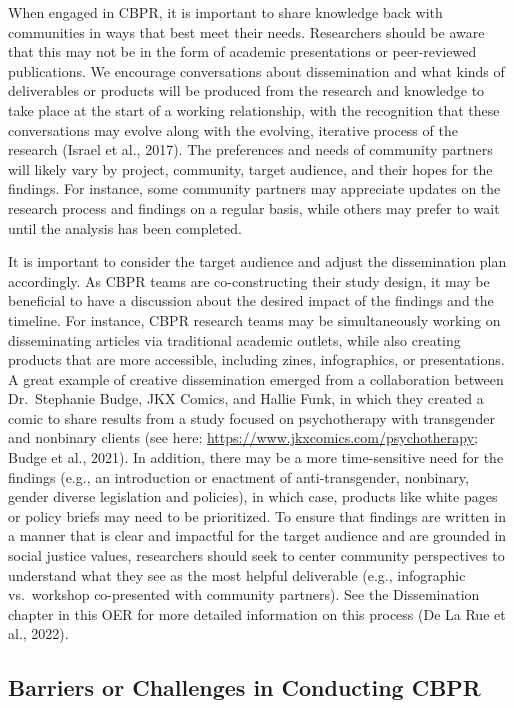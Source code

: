 \documentclass[
  11pt,
]{book}
\begin{document}
When engaged in CBPR, it is important to share knowledge back with communities in ways that best meet their needs. Researchers should be aware that this may not be in the form of academic presentations or peer-reviewed publications. We encourage conversations about dissemination and what kinds of deliverables or products will be produced from the research and knowledge to take place at the start of a working relationship, with the recognition that these conversations may evolve along with the evolving, iterative process of the research (Israel et al., 2017). The preferences and needs of community partners will likely vary by project, community, target audience, and their hopes for the findings. For instance, some community partners may appreciate updates on the research process and findings on a regular basis, while others may prefer to wait until the analysis has been completed.

It is important to consider the target audience and adjust the dissemination plan accordingly. As CBPR teams are co-constructing their study design, it may be beneficial to have a discussion about the desired impact of the findings and the timeline. For instance, CBPR research teams may be simultaneously working on disseminating articles via traditional academic outlets, while also creating products that are more accessible, including zines, infographics, or presentations. A great example of creative dissemination emerged from a collaboration between Dr.~Stephanie Budge, JKX Comics, and Hallie Funk, in which they created a comic to share results from a study focused on psychotherapy with transgender and nonbinary clients (see here: \url{https://www.jkxcomics.com/psychotherapy}; Budge et al., 2021). In addition, there may be a more time-sensitive need for the findings (e.g., an introduction or enactment of anti-transgender, nonbinary, gender diverse legislation and policies), in which case, products like white pages or policy briefs may need to be prioritized. To ensure that findings are written in a manner that is clear and impactful for the target audience and are grounded in social justice values, researchers should seek to center community perspectives to understand what they see as the most helpful deliverable (e.g., infographic vs.~workshop co-presented with community partners). See the Dissemination chapter in this OER for more detailed information on this process (De La Rue et al., 2022).

\subsection{Barriers or Challenges in Conducting CBPR}\label{barriers-or-challenges-in-conducting-cbpr}
\end{document}
